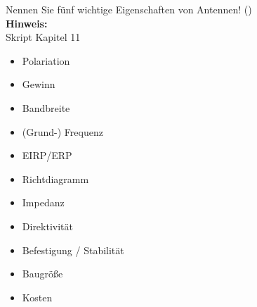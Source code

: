 \begin{question}[section=11,name={Antennen},difficulty=,quantity=1,type=thr,tags={20160310,20131210}]
	Nennen Sie fünf wichtige Eigenschaften von Antennen! ()
	\\ \textbf{Hinweis:}\\
	Skript Kapitel 11
\end{question}
\begin{solution}
	\begin{itemize}
		\item{Polariation}
		\item{Gewinn}
		\item{Bandbreite}
		\item{(Grund-) Frequenz}
		\item{EIRP/ERP}
		\item{Richtdiagramm}
		\item{Impedanz}
		\item{Direktivität}
		\item{Befestigung / Stabilität}
		\item{Baugröße}
		\item{Kosten}
	\end{itemize}
\end{solution}